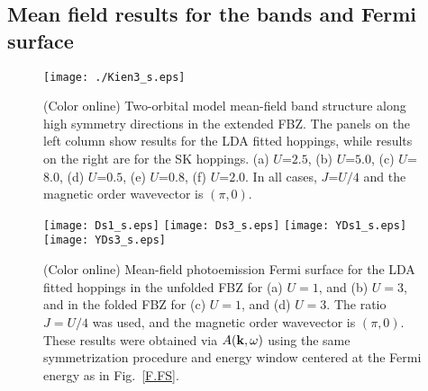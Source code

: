 \documentclass[aps,prb,superscriptaddress,preprintnumbers,
showpacs,legalpaper,twoside,twocolumn,amsmath,amssymb]{revtex4}
\begin{document}


\subsection{Mean field results for the bands and Fermi surface}

\begin{figure}
\centerline{\texttt{[image: ./Kien3\_s.eps]}}
\caption{(Color online) Two-orbital model mean-field
band structure along high symmetry directions in the extended FBZ.
The panels on the left column show results for the LDA fitted
hoppings,\cite{scalapino} while results on the right are for the SK
hoppings.\cite{daghofer} (a) $U$=$2.5$, (b) $U$=$5.0$, (c)
$U$=$8.0$, (d) $U$=$0.5$, (e) $U$=$0.8$, (f) $U$=$2.0$. In all
cases, $J$=$U/4$ and the magnetic order wavevector is $(\pi,0)$. }
\vskip -0.1cm \label{kien3}
\end{figure}







\begin{figure}[thbp]
\begin{center}
\texttt{[image: Ds1\_s.eps]}
\texttt{[image: Ds3\_s.eps]}
\texttt{[image: YDs1\_s.eps]}
\texttt{[image: YDs3\_s.eps]}
\caption{(Color online) Mean-field photoemission Fermi surface
for the LDA fitted hoppings\cite{scalapino}
in the unfolded FBZ for (a) $U=1$, and (b) $U=3$, and in the folded FBZ
for (c) $U=1$, and (d) $U=3$. The ratio $J=U/4$ was used, and the
magnetic order wavevector is $(\pi,0)$. These results
were obtained via $A({\bf k},\omega)$ using the same
symmetrization procedure and energy window centered at the Fermi energy as in Fig.~\ref{F.FS}.
}
\vskip -0.5cm
\label{kien4}
\end{center}
\end{figure}
\end{document}
